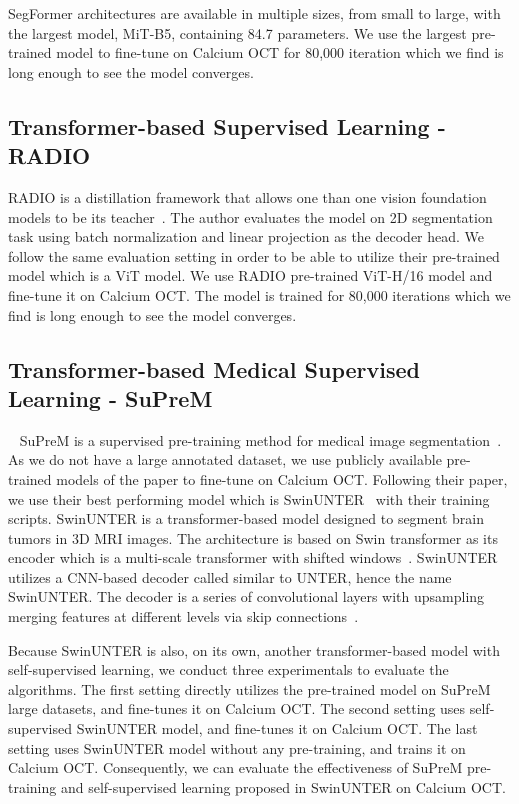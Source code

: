 \documentclass[a4paper,11pt,oneside]{report}
\begin{document}
SegFormer architectures are available in multiple sizes, from small to large, with the largest model, MiT-B5, containing 84.7 parameters. We use the largest pre-trained model to fine-tune on Calcium OCT for 80,000 iteration which we find is long enough to see the model converges.

\subsection{Transformer-based Supervised Learning - RADIO}
RADIO is a distillation framework that allows one than one vision foundation models to be its teacher~\cite{Ranzinger2024RADIO}. The author evaluates the model on 2D segmentation task using batch normalization and linear projection as the decoder head. We follow the same evaluation setting in order to be able to utilize their pre-trained model which is a ViT model. We use RADIO pre-trained ViT-H/16 model and fine-tune it on Calcium OCT. The model is trained for 80,000 iterations which we find is long enough to see the model converges.

\subsection{Transformer-based Medical Supervised Learning - SuPreM}~\label{sec:design:suprem}
SuPreM is a supervised pre-training method for medical image segmentation~\cite{Li2024}. As we do not have a large annotated dataset, we use publicly available pre-trained models of the paper to fine-tune on Calcium OCT. Following their paper, we use their best performing model which is SwinUNTER~\cite{Tang2022} with their training scripts. SwinUNTER is a transformer-based model designed to segment brain tumors in 3D MRI images. The architecture is based on Swin transformer as its encoder which is a multi-scale transformer with shifted windows~\cite{Liu2021Swin}. SwinUNTER utilizes a CNN-based decoder called similar to UNTER, hence the name SwinUNTER. The decoder is a series of convolutional layers with upsampling merging features at different levels via skip connections~\cite{Hatamizadeh2022}.

Because SwinUNTER is also, on its own, another transformer-based model with self-supervised learning, we conduct three experimentals to evaluate the algorithms. The first setting directly utilizes the pre-trained model on SuPreM large datasets, and fine-tunes it on Calcium OCT. The second setting uses self-supervised SwinUNTER model, and fine-tunes it on Calcium OCT. The last setting uses SwinUNTER model without any pre-training, and trains it on Calcium OCT. Consequently, we can evaluate the effectiveness of SuPreM pre-training and self-supervised learning proposed in SwinUNTER on Calcium OCT.
\end{document}
